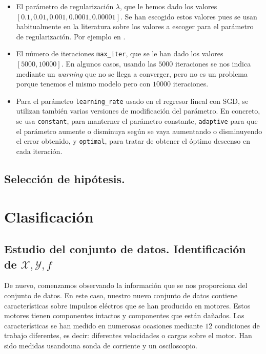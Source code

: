 \documentclass[a4paper, 20pt]{article}
\begin{document}
\begin{itemize}
\item El parámetro de regularización $\lambda$, que le hemos dado los valores $[0.1,0.01,0.001,0.0001,0.00001]$. Se han escogido estos valores pues se usan habitualmente en la literatura sobre los valores a escoger para el parámetro de regularización. Por ejemplo en \cite{2013applied}.

\item El número de iteraciones \lstinline{max_iter}, que se le han dado los valores $[5000,10000]$. En algunos casos, usando las $5000$ iteraciones se nos indica mediante un \emph{warning} que no se llega a converger, pero no es un problema porque tenemos el mismo modelo pero con $10000$ iteraciones.

  \item Para el parámetro \lstinline{learning_rate} usado en el regresor lineal con SGD, se utilizan también varias versiones de modificación del parámetro. En concreto, se usa \lstinline{constant}, para manterner el parámetro constante, \lstinline{adaptive} para que el parámetro aumente o disminuya según se vaya aumentando o disminuyendo el error obtenido, y \lstinline{optimal}, para tratar de obtener el óptimo descenso en cada iteración.

\end{itemize}


\subsection{Selección de hipótesis.}





\newpage

\section{Clasificación}

\subsection{Estudio del conjunto de datos. Identificación de $\mathcal X, \mathcal Y, f$}

De nuevo, comenzamos observando la información que se nos proporciona del conjunto de datos. En este caso, nuestro nuevo conjunto de datos \cite{noauthor_uci_nodate} contiene características sobre impulsos eléctros que se han producido en motores. Estos motores tienen componentes intactos y componentes que están dañados. Las características se han medido en numerosas ocasiones mediante $12$ condiciones de trabajo diferentes, es decir: diferentes velocidades o cargas sobre el motor. Han sido medidas usandouna sonda de corriente y un osciloscopio.
\end{document}
